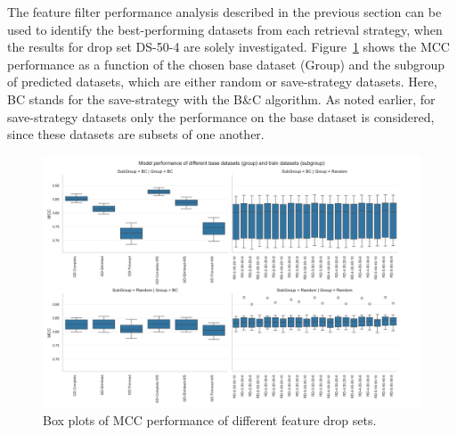 The feature filter performance analysis described in the previous section can be used to identify the best-performing datasets
from each retrieval strategy, when the results for drop set DS-50-4 are solely investigated. Figure~\ref{fig:dataset_performance_group_subgroup}
shows the \gls{MCC} performance as a function of the chosen base dataset (Group) and the subgroup of predicted datasets, which are either
random or save-strategy datasets. Here, BC stands for the save-strategy with the B\&C algorithm.
As noted earlier, for save-strategy datasets only the performance on the base dataset is considered,
since these datasets are subsets of one another.
\begin{figure}[ht]
	\centering
	\includegraphics[width =\textwidth]{pictures/feature_filter/group_subgroup_results.png}
	\caption{Box plots of MCC performance of different feature drop sets.}
	\label{fig:dataset_performance_group_subgroup}
\end{figure}

